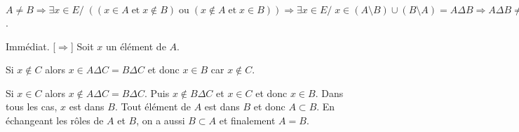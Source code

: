 {\begin{enumerate}
{$A\neq B\Rightarrow\exists x\in E/\;((x\in A\;\mbox{et}\;x\notin B)\;\mbox{ou}\;(x\notin A\;\mbox{et}\;
x\in B))\Rightarrow\exists x\in E/\;x\in(A\setminus B)\cup(B\setminus A)=A\Delta B\Rightarrow A\Delta B\neq\varnothing$.
\begin{itemize}
[$\Leftarrow$] Immédiat.
[$\Rightarrow$] Soit $x$ un élément de $A$.

Si $x\notin C$ alors $x\in A\Delta C=B\Delta C$ et donc $x\in B$ car $x\notin C$.

Si $x\in C$ alors $x\notin A\Delta C=B\Delta C$. Puis $x\notin B\Delta C$ et $x\in C$ et donc $x\in B$. Dans tous les
cas, $x$ est dans $B$. Tout élément de $A$ est dans $B$ et donc $A\subset B$.
En échangeant les rôles de $A$ et $B$, on a aussi $B\subset A$ et finalement $A=B$.
\end{itemize}
}
\end{enumerate}
}
